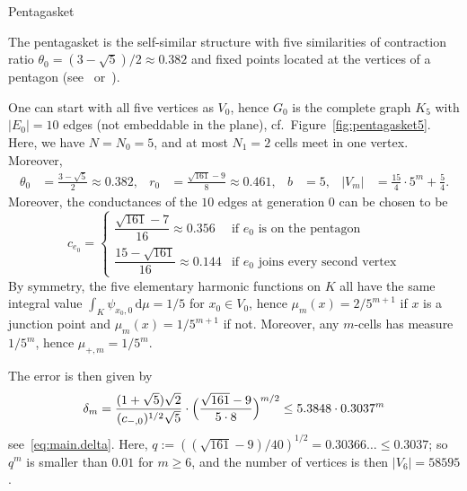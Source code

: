 \documentclass[12pt,reqno,a4paper]{amsart}            %
\makeatletter
\numberwithin{equation}{section}
\newcommand{\myfont}{\sffamily}
\theoremstyle{mythmstyle}       %
\theoremstyle{mydefstyle}        %
\renewcommand\subsection{\@startsection{subsection}{2}%
  \z@{-.5\linespacing\@plus-.7\linespacing}{.5\linespacing}%
  {\large\myfont\bfseries}}
\newcommand{\Fig}[1]{Figure~\ref{fig:#1}}
\newcommand{\card}[1]{\lvert#1\rvert}   %
\newcommand{\dd}    {\, \mathrm d}    %
\newcommand{\1}{\mathbbm 1}                    %
\newcommand{\conductance}{c}  %
\makeatother
\begin{document}
\subsection{Pentagasket}
\label{ssec:pentagasket}


The pentagasket is the self-similar structure with five similarities
of contraction ratio $\theta_0=(3-\sqrt 5)/2\approx 0.382$ and fixed
points located at the vertices of a pentagon (see~\cite{asst:01}
or~\cite[Example~4.3.3 and Exercise~4.3.2]{strichartz:06}).

One can start with all five vertices as $V_0$, hence $G_0$ is the
complete graph $K_5$ with $\card{E_0}=10$ edges (not embeddable in the
plane), cf.~\Fig{pentagasket5}.  Here, we have $N=N_0=5$, and at most
$N_1=2$ cells meet in one vertex.  Moreover,
\begin{align*}
  \theta_0&=\frac {3-\sqrt 5}2 \approx 0.382,&
  r_0&=\frac{\sqrt{161}-9}8 \approx 0.461,&
  b&=5,&
  \card {V_m}
  &=\frac{15}4 \cdot 5^m +\frac 54.
\end{align*}
Moreover, the conductances of the $10$ edges at generation $0$ can be
chosen to be
\begin{equation*}
  \conductance_{e_0}=
  \begin{cases}
    \dfrac{\sqrt{161}-7}{16}\approx 0.356 
         &\text{if $e_0$ is on the pentagon}\\[2ex]
    \dfrac{15-\sqrt{161}}{16}\approx 0.144 
         &\text{if $e_0$ joins every second vertex}
  \end{cases}
\end{equation*}
By symmetry, the five elementary harmonic functions on $K$ all have
the same integral value $\int_K \psi_{x_0,0} \dd \mu =1/5$ for $x_0
\in V_0$, hence $\mu_m(x)=2/5^{m+1}$ if $x$ is a junction point and
$\mu_m(x)=1/5^{m+1}$ if not.  Moreover, any $m$-cells has measure
$1/5^m$, hence $\mu_{+,m}=1/5^m$.

The error is then given by
\begin{equation*}
  \delta_m
  = \frac {(1+\sqrt 5)\sqrt 2}{(\conductance_{-,0})^{1/2}\sqrt 5}
  \cdot \Bigl(\frac{\sqrt{161}-9}{5 \cdot 8}\Bigr)^{m/2}
  \le 5.3848 \cdot 0.3037^m
\end{equation*}
see~\eqref{eq:main.delta}.  Here,
$q:=((\sqrt{161}-9)/40)^{1/2}=0.30366 \ldots \le 0.3037$; so $q^m$ is
smaller than $0.01$ for $m \ge 6$, and the number of vertices is
then $\card{V_6}=58595$.
\end{document}

